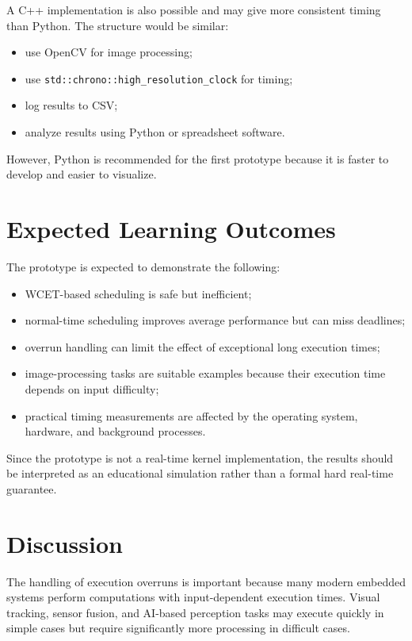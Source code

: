 \documentclass[conference]{IEEEtran}
\begin{document}
A C++ implementation is also possible and may give more consistent timing than Python. The structure would be similar:

\begin{itemize}
    \item use OpenCV for image processing;
    \item use \texttt{std::chrono::high\_resolution\_clock} for timing;
    \item log results to CSV;
    \item analyze results using Python or spreadsheet software.
\end{itemize}

However, Python is recommended for the first prototype because it is faster to develop and easier to visualize.

\section{Expected Learning Outcomes}

The prototype is expected to demonstrate the following:

\begin{itemize}
    \item WCET-based scheduling is safe but inefficient;
    \item normal-time scheduling improves average performance but can miss deadlines;
    \item overrun handling can limit the effect of exceptional long execution times;
    \item image-processing tasks are suitable examples because their execution time depends on input difficulty;
    \item practical timing measurements are affected by the operating system, hardware, and background processes.
\end{itemize}

Since the prototype is not a real-time kernel implementation, the results should be interpreted as an educational simulation rather than a formal hard real-time guarantee.

\section{Discussion}

The handling of execution overruns is important because many modern embedded systems perform computations with input-dependent execution times. Visual tracking, sensor fusion, and AI-based perception tasks may execute quickly in simple cases but require significantly more processing in difficult cases.
\end{document}
